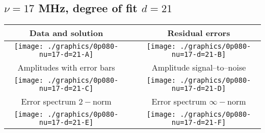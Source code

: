 

% 

\clearpage{}
\break{}

\subsection{$\nu = 17$ MHz, degree of fit $d = 21$}

\begin{table}[h]
    \begin{center}
        \begin{tabular}{ccc}
            Data and solution & \quad & Residual errors \\\hline
            \texttt{[image: ./graphics/0p080-nu=17-d=21-A]} &&
            \texttt{[image: ./graphics/0p080-nu=17-d=21-B]} \\[15pt]
            Amplitudes with error bars && Amplitude signal--to--noise \\\hline
            \texttt{[image: ./graphics/0p080-nu=17-d=21-C]} &&
            \texttt{[image: ./graphics/0p080-nu=17-d=21-D]} \\[15pt]
            Error spectrum $2-$norm && Error spectrum $\infty-$norm \\\hline
            \texttt{[image: ./graphics/0p080-nu=17-d=21-E]} &&
            \texttt{[image: ./graphics/0p080-nu=17-d=21-F]} \\[15pt]
        \end{tabular}
    \end{center}
\label{fig:elev=80, nu=17}
\end{table}



\endinput
